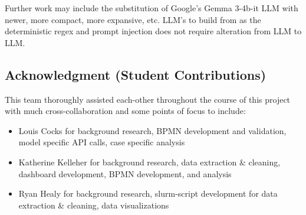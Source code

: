 \documentclass[conference]{IEEEtran}
\begin{document}
Further work may include the substitution of Google's Gemma 3-4b-it LLM with newer, more compact, more expansive, etc. LLM's to build from as the deterministic regex and prompt injection does not require alteration from LLM to LLM.

\subsection*{Acknowledgment (Student Contributions)}
This team thoroughly assisted each-other throughout the course of this project with much cross-collaboration and some points of focus to include:
\begin{itemize}
    \item Louis Cocks for background research, BPMN development and validation, model specific API calls, case specific analysis
    \item Katherine Kelleher for background research, data extraction \& cleaning, dashboard development, BPMN development, and analysis
    \item Ryan Healy for background research, slurm-script development for data extraction \& cleaning, data visualizations
\end{itemize}
\end{document}
